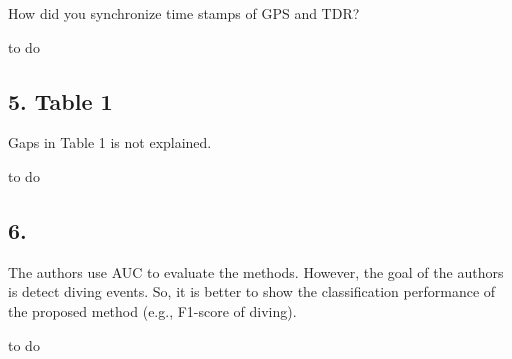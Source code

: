 \documentclass{ar2rc}
\begin{document}
\RC How did you synchronize time stamps of GPS and TDR?

\AR to do

\subsection*{5. Table 1}

\RC Gaps in Table 1 is not explained.

\AR to do

\subsection*{6.}

\RC The authors use AUC to evaluate the methods. However, the goal of the authors is detect diving events. So, it is better to show the classification performance of the proposed method (e.g., F1-score of diving).

\AR to do
\end{document}
